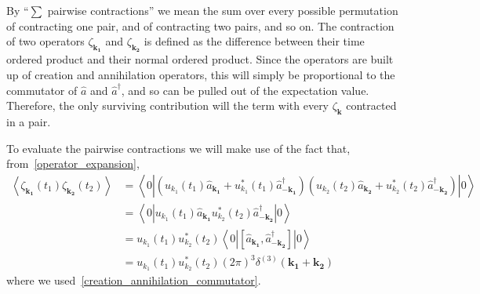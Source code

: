 By ``$\sum$ pairwise contractions'' we mean the sum over every possible permutation of contracting one pair,
and of contracting two pairs, and so on.
The contraction of two operators $\zeta_{\mathbf{k_1}}$ and $\zeta_{\mathbf{k_2}}$
is defined as the difference between their time ordered product and their normal ordered product.
Since the operators are built up of creation and annihilation operators, this will simply
be proportional to the commutator of $\hat{a}$ and $\hat{a}^{\dagger}$,
and so can be pulled out of the expectation value.
Therefore, the only surviving contribution will the term with every $\zeta_{\mathbf{k}}$
contracted in a pair.


To evaluate the pairwise contractions we will make use of the fact that, from~\eqref{operator_expansion},
\begin{align}
    \left<\zeta_{\mathbf{k_1}}(t_1)\zeta_{\mathbf{k_2}}(t_2)\right>
    &= \left<0\left|
            \left(u_{k_1}(t_1)\hat{a}_\mathbf{k_1} +
            u^*_{k_1}(t_1)\hat{a}^{\dagger}_{-\mathbf{k_1}}\right)
            \left(u_{k_2}(t_2)\hat{a}_\mathbf{k_2} +
            u^*_{k_2}(t_2)\hat{a}^{\dagger}_{-\mathbf{k_2}}\right)
        \right|0\right>\\
    &= \left<0\left|
            u_{k_1}(t_1)\hat{a}_\mathbf{k_1}
            u^*_{k_2}(t_2)\hat{a}^{\dagger}_{-\mathbf{k_2}}
        \right|0\right>\\
    &= u_{k_1}(t_1)u^*_{k_2}(t_2)\left<0\left|
            \left[\hat{a}_\mathbf{k_1},
            \hat{a}^{\dagger}_{-\mathbf{k_2}}\right]
        \right|0\right>\\
    &= u_{k_1}(t_1)u^*_{k_2}(t_2)(2\pi)^3\delta^{(3)}(\mathbf{k_1}+\mathbf{k_2})
\end{align}
where we used~\eqref{creation_annihilation_commutator}.


